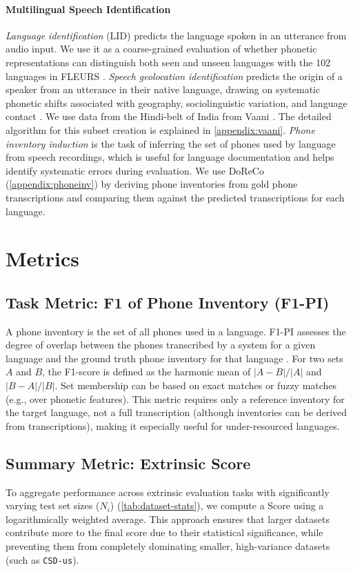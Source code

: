 \paragraph{Multilingual Speech Identification}
\textit{Language identification} (LID) predicts the language spoken in an utterance from audio input. We use it as a coarse-grained evaluation of whether phonetic representations can distinguish both seen and unseen languages with the 102 languages in FLEURS \cite{conneau2023fleurs}.
\textit{Speech geolocation identification} predicts the origin of a speaker from an utterance in their native language, drawing on systematic phonetic shifts associated with geography, sociolinguistic variation, and language contact \citep{foley-2024-geolocating}. 
We use data from the Hindi-belt of India from Vaani \cite{vaani2025}. The detailed algorithm for this subset creation is explained in \autoref{appendix:vaani}.
\textit{Phone inventory induction} is the task of inferring the set of phones used by language from speech recordings, which is useful for language documentation and helps identify systematic errors during evaluation.
We use DoReCo (\autoref{appendix:phoneinv}) by deriving phone inventories from gold phone transcriptions and comparing them against the predicted transcriptions for each language.

\section{Metrics}
\subsection{Task Metric: F1 of Phone Inventory (F1-PI)}
\label{appendix:phoneinv}
A phone inventory is the set of all phones used in a language.
F1-PI assesses the degree of overlap between the phones transcribed by a system for a given language and the ground truth phone inventory for that language \citep{zelasko2022discovering}.
For two sets $A$ and $B$, the F1-score is defined as the harmonic mean of $|A-B|/|A|$ and $|B-A|/|B|$.
Set membership can be based on exact matches or fuzzy matches (e.g., over phonetic features).
This metric requires only a reference inventory for the target language, not a full transcription (although inventories can be derived from transcriptions), making it especially useful for under-resourced languages.

\subsection{Summary Metric: \bench Extrinsic Score}
\label{appendix:phonebenchscore}
To aggregate performance across extrinsic evaluation tasks with significantly varying test set sizes ($N_i$) (\autoref{tab:dataset-stats}), we compute a Score using a logarithmically weighted average. 
This approach ensures that larger datasets contribute more to the final score due to their statistical significance, while preventing them from completely dominating smaller, high-variance datasets (such as \texttt{CSD-us}).

